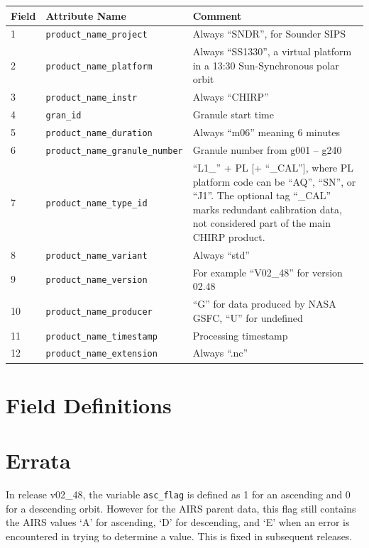 \documentclass[11pt]{article}
\begin{document}
{\footnotesize
\begin{center}
\begin{tabular}{|m{7mm}|m{5.5cm}|m{8cm}| }
  \hline
  Field & Attribute Name & Comment \\
  \hline\hline
   1 & \texttt{product\_name\_project} & Always ``SNDR'', for Sounder
   SIPS \\
   \hline
   2 & \texttt{product\_name\_platform} & Always ``SS1330'', a virtual
   platform in a 13:30 Sun-Synchronous polar orbit\\
   \hline
   3 & \texttt{product\_name\_instr} & Always “CHIRP” \\
   \hline
   4 & \texttt{gran\_id} & Granule start time \\
   \hline
   5 & \texttt{product\_name\_duration} & Always ``m06'' meaning 6
   minutes \\
   \hline
   6 & \texttt{product\_name\_granule\_number} & Granule number from
   g001 – g240 \\
   \hline
   7 & \texttt{product\_name\_type\_id} & ``L1\_'' + PL [+
     ``\_CAL''], where PL platform code can be ``AQ'', ``SN'', or
   ``J1''.  The optional tag ``\_CAL'' marks redundant calibration
   data, not considered part of the main CHIRP product. \\
   \hline
   8 & \texttt{product\_name\_variant} & Always ``std''\\
   \hline
   9 & \texttt{product\_name\_version} & For example ``V02\_48'' for
   version 02.48 \\
   \hline
   10 & \texttt{product\_name\_producer} & ``G'' for data produced
   by NASA GSFC, ``U'' for undefined \\
   \hline
   11 & \texttt{product\_name\_timestamp} & Processing timestamp \\
   \hline
   12 & \texttt{product\_name\_extension} & Always ``.nc'' \\
   \hline
\end{tabular}
\end{center}
}


\section{Field Definitions}
\label{fields}
{\footnotesize

}
{\scriptsize


}

\section{Errata}

In release v02\_48, the variable \texttt{asc\_flag} is defined as
1 for an ascending and 0 for a descending orbit.  However for the
AIRS parent data, this flag still contains the AIRS values `A' for
ascending, `D' for descending, and `E' when an error is encountered
in trying to determine a value.  This is fixed in subsequent
releases.
\end{document}
